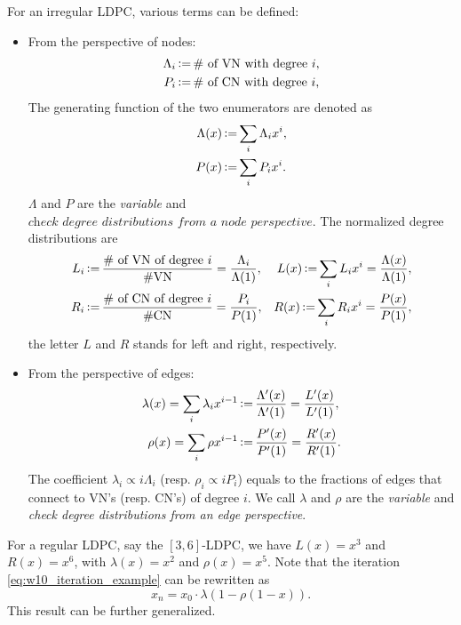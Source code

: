 \begin{definition}
    For an irregular LDPC, various terms can be defined:
    \begin{itemize}
        \item From the perspective of nodes:
        \begin{align}
            \Lambda_i &\operatorname{\vcentcolon=} \#\text{ of VN with degree } i, \\
            P_i &\operatorname{\vcentcolon=} \#\text{ of CN with degree } i,
        \end{align}
        The generating function of the two enumerators are denoted as
        \begin{align}
            \Lambda(x) &\operatorname{\vcentcolon=} \sum_{i} \Lambda_i x^i, \\
            P(x) &\operatorname{\vcentcolon=} \sum_{i} P_i x^i.
        \end{align}
        $\Lambda$ and $P$ are the \textit{variable} and $\textit{check degree distributions from a node perspective}$. The normalized degree distributions are
        \begin{align}
            L_i &\operatorname{\vcentcolon=} \frac{\#\text{ of VN of degree } i}{\#\text{VN}} = \frac{\Lambda_i}{\Lambda(1)}, &L(x) \operatorname{\vcentcolon=} \sum_{i} L_i x^i = \frac{\Lambda(x)}{\Lambda(1)}, \\
            R_i &\operatorname{\vcentcolon=} \frac{\#\text{ of CN of degree } i}{\#\text{CN}} = \frac{P_i}{P(1)}, &R(x) \operatorname{\vcentcolon=} \sum_{i} R_i x^i = \frac{P(x)}{P(1)},
        \end{align}
        the letter $L$ and $R$ stands for left and right, respectively.
        \item From the perspective of edges:
        \begin{align}
            \lambda(x) = \sum_{i} \lambda_i x^{i-1} &\operatorname{\vcentcolon=} \frac{\Lambda'(x)}{\Lambda'(1)} = \frac{L'(x)}{L'(1)}, \\
            \rho(x) = \sum_{i} \rho x^{i-1} &\operatorname{\vcentcolon=} \frac{P'(x)}{P'(1)} = \frac{R'(x)}{R'(1)}.
        \end{align}
        The coefficient $\lambda_i\propto i\Lambda_i$ (resp. $\rho_i\propto iP_i$) equals to the fractions of edges that connect to VN's (resp. CN's) of degree $i$. We call $\lambda$ and $\rho$ are the \textit{variable} and \textit{check degree distributions from an edge perspective}.
    \end{itemize}
\end{definition}

\begin{example}
    For a regular LDPC, say the $[3,6]$-LDPC, we have $L(x)=x^3$ and $R(x)=x^6$, with $\lambda(x)=x^2$ and $\rho(x)=x^5$. Note that the iteration \autoref{eq:w10_iteration_example} can be rewritten as
    \begin{equation}
        x_{n} = x_0 \cdot \lambda\left(1-\rho(1-x)\right).
    \end{equation}
    This result can be further generalized.
\end{example}

